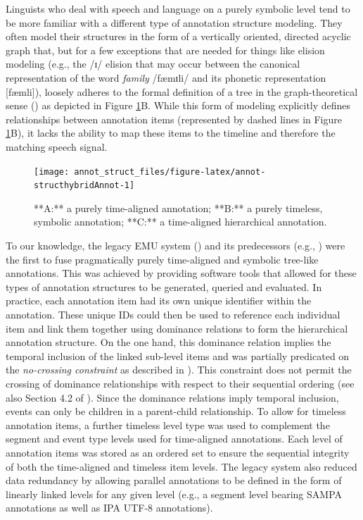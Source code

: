 \documentclass[]{book}
\begin{document}
Linguists who deal with speech and language on a purely symbolic level tend to be more familiar with a different type of annotation structure modeling. They often model their structures in the form of a vertically oriented, directed acyclic graph that, but for a few exceptions that are needed for things like elision modeling (e.g., the /ɪ/ elision that may occur between the canonical representation of the word \emph{family} /fæmɪli/ and its phonetic representation {[}fæmli{]}), loosely adheres to the formal definition of a tree in the graph-theoretical sense (\citet{knuth:ar1968a}) as depicted in Figure \ref{fig:annot-structhybridAnnot}B. While this form of modeling explicitly defines relationships between annotation items (represented by dashed lines in Figure \ref{fig:annot-structhybridAnnot}B), it lacks the ability to map these items to the timeline and therefore the matching speech signal.

\begin{figure}

{\centering \texttt{[image: annot\_struct\_files/figure-latex/annot-structhybridAnnot-1]} 

}

\caption{**A:** a purely time-aligned annotation; **B:** a purely timeless, symbolic annotation; **C:** a time-aligned hierarchical annotation.}\label{fig:annot-structhybridAnnot}
\end{figure}

To our knowledge, the legacy EMU system (\citet{cassidy:sc2001a}) and its predecessors (e.g., \citet{harrington:csl1993a}) were the first to fuse pragmatically purely time-aligned and symbolic tree-like annotations. This was achieved by providing software tools that allowed for these types of annotation structures to be generated, queried and evaluated. In practice, each annotation item had its own unique identifier within the annotation. These unique IDs could then be used to reference each individual item and link them together using dominance relations to form the hierarchical annotation structure. On the one hand, this dominance relation implies the temporal inclusion of the linked sub-level items and was partially predicated on the \emph{no-crossing constraint} as described in \citet{coleman:lp1991a}). This constraint does not permit the crossing of dominance relationships with respect to their sequential ordering (see also Section 4.2 of \citet{cassidy:sc2001a}). Since the dominance relations imply temporal inclusion, events can only be children in a parent-child relationship. To allow for timeless annotation items, a further timeless level type was used to complement the segment and event type levels used for time-aligned annotations. Each level of annotation items was stored as an ordered set to ensure the sequential integrity of both the time-aligned and timeless item levels. The legacy system also reduced data redundancy by allowing parallel annotations to be defined in the form of linearly linked levels for any given level (e.g., a segment level bearing SAMPA annotations as well as IPA UTF-8 annotations).
\end{document}
